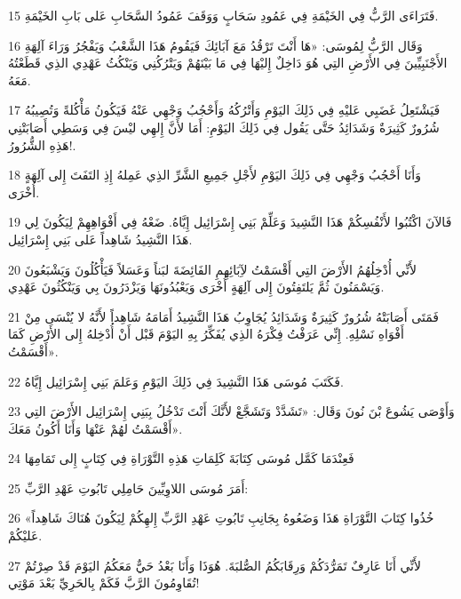 \par 15 فَتَرَاءَى الرَّبُّ فِي الخَيْمَةِ فِي عَمُودِ سَحَابٍ وَوَقَفَ عَمُودُ السَّحَابِ عَلى بَابِ الخَيْمَةِ.
\par 16 وَقَال الرَّبُّ لِمُوسَى: «هَا أَنْتَ تَرْقُدُ مَعَ آبَائِكَ فَيَقُومُ هَذَا الشَّعْبُ وَيَفْجُرُ وَرَاءَ آلِهَةِ الأَجْنَبِيِّينَ فِي الأَرْضِ التِي هُوَ دَاخِلٌ إِليْهَا فِي مَا بَيْنَهُمْ وَيَتْرُكُنِي وَيَنْكُثُ عَهْدِي الذِي قَطَعْتُهُ مَعَهُ.
\par 17 فَيَشْتَعِلُ غَضَبِي عَليْهِ فِي ذَلِكَ اليَوْمِ وَأَتْرُكُهُ وَأَحْجُبُ وَجْهِي عَنْهُ فَيَكُونُ مَأْكُلةً وَتُصِيبُهُ شُرُورٌ كَثِيرَةٌ وَشَدَائِدُ حَتَّى يَقُول فِي ذَلِكَ اليَوْمِ: أَمَا لأَنَّ إِلهِي ليْسَ فِي وَسَطِي أَصَابَتْنِي هَذِهِ الشُّرُورُ!.
\par 18 وَأَنَا أَحْجُبُ وَجْهِي فِي ذَلِكَ اليَوْمِ لأَجْلِ جَمِيعِ الشَّرِّ الذِي عَمِلهُ إِذِ التَفَتَ إِلى آلِهَةٍ أُخْرَى.
\par 19 فَالآنَ اكْتُبُوا لأَنْفُسِكُمْ هَذَا النَّشِيدَ وَعَلِّمْ بَنِي إِسْرَائِيل إِيَّاهُ. ضَعْهُ فِي أَفْوَاهِهِمْ لِيَكُونَ لِي هَذَا النَّشِيدُ شَاهِداً عَلى بَنِي إِسْرَائِيل.
\par 20 لأَنِّي أُدْخِلُهُمُ الأَرْضَ التِي أَقْسَمْتُ لآِبَائِهِمِ الفَائِضَةَ لبَناً وَعَسَلاً فَيَأْكُلُونَ وَيَشْبَعُونَ وَيَسْمَنُونَ ثُمَّ يَلتَفِتُونَ إِلى آلِهَةٍ أُخْرَى وَيَعْبُدُونَهَا وَيَزْدَرُونَ بِي وَيَنْكُثُونَ عَهْدِي.
\par 21 فَمَتَى أَصَابَتْهُ شُرُورٌ كَثِيرَةٌ وَشَدَائِدُ يُجَاوِبُ هَذَا النَّشِيدُ أَمَامَهُ شَاهِداً لأَنَّهُ لا يُنْسَى مِنْ أَفْوَاهِ نَسْلِهِ. إِنِّي عَرَفْتُ فِكْرَهُ الذِي يُفَكِّرُ بِهِ اليَوْمَ قَبْل أَنْ أُدْخِلهُ إِلى الأَرْضِ كَمَا أَقْسَمْتُ».
\par 22 فَكَتَبَ مُوسَى هَذَا النَّشِيدَ فِي ذَلِكَ اليَوْمِ وَعَلمَ بَنِي إِسْرَائِيل إِيَّاهُ.
\par 23 وَأَوْصَى يَشُوعَ بْنَ نُونَ وَقَال: «تَشَدَّدْ وَتَشَجَّعْ لأَنَّكَ أَنْتَ تَدْخُلُ بِبَنِي إِسْرَائِيل الأَرْضَ التِي أَقْسَمْتُ لهُمْ عَنْهَا وَأَنَا أَكُونُ مَعَكَ».
\par 24 فَعِنْدَمَا كَمَّل مُوسَى كِتَابَةَ كَلِمَاتِ هَذِهِ التَّوْرَاةِ فِي كِتَابٍ إِلى تَمَامِهَا
\par 25 أَمَرَ مُوسَى اللاوِيِّينَ حَامِلِي تَابُوتِ عَهْدِ الرَّبِّ:
\par 26 «خُذُوا كِتَابَ التَّوْرَاةِ هَذَا وَضَعُوهُ بِجَانِبِ تَابُوتِ عَهْدِ الرَّبِّ إِلهِكُمْ لِيَكُونَ هُنَاكَ شَاهِداً عَليْكُمْ.
\par 27 لأَنِّي أَنَا عَارِفٌ تَمَرُّدَكُمْ وَرِقَابَكُمُ الصُّلبَةَ. هُوَذَا وَأَنَا بَعْدُ حَيٌّ مَعَكُمُ اليَوْمَ قَدْ صِرْتُمْ تُقَاوِمُونَ الرَّبَّ فَكَمْ بِالحَرِيِّ بَعْدَ مَوْتِي!
